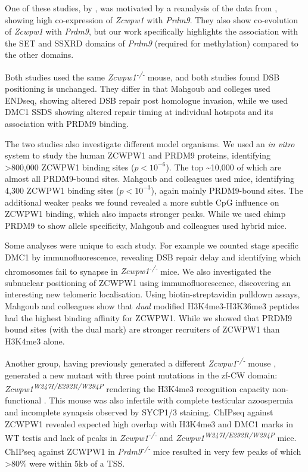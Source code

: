 One of these studies, by \cite{Mahgoub2019Dual}, was motivated by a reanalysis of the data from \cite{Chen2018Singlecell}, showing high co-expression of \textit{Zcwpw1} with \textit{Prdm9}. They also show co-evolution of \textit{Zcwpw1} with \textit{Prdm9}, but our work specifically highlights the association with the SET and SSXRD domains of \textit{Prdm9} (required for methylation) compared to the other domains.

Both studies used the same \textit{Zcwpw1\textsuperscript{-/-}} mouse, and both studies found DSB positioning is unchanged. They differ in that Mahgoub and colleges used ENDseq, showing altered DSB repair post homologue invasion, while we used DMC1 SSDS showing altered repair timing at individual hotspots and its association with PRDM9 binding.

The two studies also investigate different model organisms. We used an \textit{in vitro} system to study the human ZCWPW1 and PRDM9 proteins, identifying >800,000 ZCWPW1 binding sites ($p<10^{-6}$). The top \textasciitilde10,000 of which are almost all PRDM9-bound sites. Mahgoub and colleagues used mice, identifying 4,300 ZCWPW1 binding sites ($p<10^{-3}$), again mainly PRDM9-bound sites. The additional weaker peaks we found revealed a more subtle CpG influence on ZCWPW1 binding, which also impacts stronger peaks. While we used chimp PRDM9 to show allele specificity, Mahgoub and colleagues used hybrid mice.

Some analyses were unique to each study. For example we counted stage specific DMC1 by immunofluorescence, revealing DSB repair delay and identifying which chromosomes fail to synapse in \textit{Zcwpw1\textsuperscript{-/-}} mice. We also investigated the subnuclear positioning of ZCWPW1 using immunofluorescence, discovering an interesting new telomeric localisation. Using biotin-streptavidin pulldown assays, Mahgoub and colleagues show that \emph{dual} modified H3K4me3-H3K36me3 peptides had the highest binding affinity for ZCWPW1. While we showed that PRDM9 bound sites (with the dual mark) are stronger recruiters of ZCWPW1 than H3K4me3 alone.

Another group, having previously generated a different \textit{Zcwpw1\textsuperscript{-/-}} mouse \parencite{Li2019histone}, generated a new mutant with three point mutations in the zf-CW domain: \textit{Zcwpw1\textsuperscript{W247I/E292R/W294P}} rendering the H3K4me3 recognition capacity non-functional \parencite{Huang2019histone}. This mouse was also infertile with complete testicular azoospermia and incomplete synapsis observed by SYCP1/3 staining. ChIPseq against ZCWPW1 revealed expected high overlap with H3K4me3 and DMC1 marks in WT testis and lack of peaks in \textit{Zcwpw1\textsuperscript{-/-}} and \textit{Zcwpw1\textsuperscript{W247I/E292R/W294P}} mice. ChIPseq against ZCWPW1 in \textit{Prdm9\textsuperscript{-/-}} mice resulted in very few peaks of which >80\% were within 5kb of a TSS.

